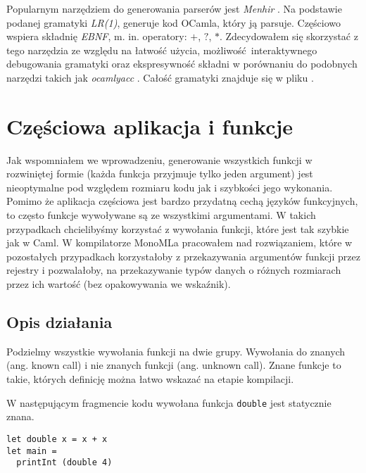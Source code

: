 \documentclass[declaration,shortabstract]{iithesis}
\begin{document}
Popularnym narzędziem do generowania parserów jest \textit{Menhir} 
\cite{menhir}. Na podstawie podanej gramatyki \textit{LR(1)}, generuje kod OCamla, 
który ją parsuje. Częściowo wspiera składnię \textit{EBNF}, m. in. operatory: $
+$, $?$, $\ast$. Zdecydowałem się skorzystać z tego narzędzia ze względu na 
łatwość użycia, możliwość interaktywnego debugowania gramatyki oraz 
ekspresywność składni w porównaniu do podobnych narzędzi takich jak \textit
{ocamlyacc} \cite{menhir}. Całość gramatyki znajduje się w pliku \newline
{}. 

\section{Częściowa aplikacja i funkcje}

Jak wspomniałem we wprowadzeniu, generowanie wszystkich funkcji w rozwiniętej 
formie (każda funkcja przyjmuje tylko jeden argument) jest nieoptymalne pod
względem rozmiaru kodu jak i szybkości jego wykonania. Pomimo że aplikacja 
częściowa jest bardzo przydatną cechą języków funkcyjnych, to często funkcje
wywoływane są ze wszystkimi argumentami. W takich przypadkach chcielibyśmy 
korzystać z wywołania funkcji, które jest tak szybkie jak w Caml. 
W kompilatorze MonoMLa pracowałem nad rozwiązaniem, które w pozostałych 
przypadkach korzystałoby z przekazywania argumentów funkcji przez rejestry i 
pozwalałoby, na przekazywanie typów danych o różnych rozmiarach przez ich 
wartość (bez opakowywania we wskaźnik). 

\subsection{Opis działania}

Podzielmy wszystkie wywołania funkcji na dwie grupy. Wywołania do znanych 
(ang. known call) i nie znanych funkcji (ang. unknown call). Znane funkcje to 
takie, których definicję można łatwo wskazać na etapie kompilacji. 

W następującym fragmencie kodu wywołana funkcja \texttt{double} jest 
statycznie znana.

\begin{lstlisting}[frame=lines] 
let double x = x + x
let main = 
  printInt (double 4)
\end{lstlisting}
\end{document}
